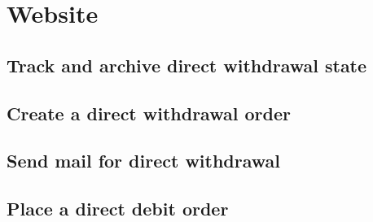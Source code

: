 \documentclass{report}
\begin{document}
\section{Website}
\subsection{Track and archive direct withdrawal state}
\subsection{Create a direct withdrawal order}
\subsection{Send mail for direct withdrawal}
\subsection{Place a direct debit order}
\end{document}
